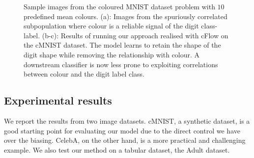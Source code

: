\begin{figure}[!htb]
{        \label{fig:cflow_cmnist_y}
    }
    \hfill
    \caption{
        Sample images from the coloured MNIST dataset problem with $10$ predefined mean colours.
        (a): Images from the spuriously correlated subpopulation where colour is a reliable signal
        of the digit class-label.
        (b-c): Results of running our approach realised with \ac{cFlow} on the cMNIST dataset.
        The model learns to retain the shape of the digit shape while removing the relationship
        with colour.
        A downstream classifier is now less prone to exploiting correlations between colour and the
        digit label class.
    }\label{fig:cmnist}
\end{figure}
%
\subsection{Experimental results}
%
We report the results from two image datasets. cMNIST, a synthetic dataset, is a good starting
point for evaluating our model due to the direct control we have over the biasing. 
%
CelebA, on the other hand, is a more practical and challenging example.
%
We also test our method on a tabular dataset, the Adult dataset.
%
